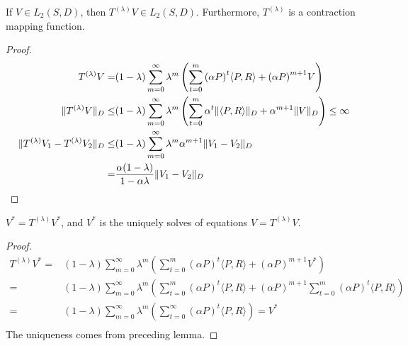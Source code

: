\begin{lem}
    If $ V \in L_2(S,D) $, then $ T^{(\lambda)} V \in L_2(S,D) $. 
    Furthermore, $ T^{(\lambda)} $ is a contraction mapping function. 
    \begin{proof}
        \begin{equation}
            \begin{aligned}
                T^{(\lambda)} V =& (1-\lambda) \sum^{\infty}_{m=0} \lambda^m
                \left( \sum^{m}_{t=0} {(\alpha P)}^t \langle P, R \rangle + {(\alpha P )}^{m+1} V \right)\\
                \Arrowvert T^{(\lambda)}V \Arrowvert_D
                \le& (1-\lambda) \sum^{\infty}_{m=0} \lambda^m 
                \left( \sum^{m}_{t=0} \alpha^t \Arrowvert \langle P, R \rangle \Arrowvert_D
                + \alpha^{m+1} \Arrowvert V \Arrowvert_D\right) \le \infty \\
                \Arrowvert T^{(\lambda)}V_1 - T^{(\lambda)}V_2 \Arrowvert_D
                \le& (1-\lambda) \sum^{\infty}_{m=0} \lambda^m \alpha^{m+1} \Arrowvert V_1 - V_2 \Arrowvert_D\\
                =& \frac{\alpha(1-\lambda)}{1-\alpha \lambda}  \Arrowvert V_1 - V_2 \Arrowvert_D
            \end{aligned}
        \end{equation}
    \end{proof}
\end{lem}

\begin{lem}
    $ V^* = T^{(\lambda)} V^* $, and $ V^* $ is the uniquely solves of equations $ V = T^{(\lambda)} V $.
    \begin{proof}
        \begin{equation}
            \begin{aligned}
                T^{(\lambda)} V^* 
                =& (1-\lambda) \sum^{\infty}_{m=0} \lambda^m
                \left( \sum^{m}_{t=0} {(\alpha P)}^t \langle P, R \rangle + {(\alpha P )}^{m+1} V^* \right)\\
                =& (1-\lambda) \sum^{\infty}_{m=0} \lambda^m
                \left( \sum^{m}_{t=0} {(\alpha P)}^t \langle P, R \rangle 
                + {(\alpha P )}^{m+1} \sum^{m}_{t=0} {(\alpha P)}^t \langle P, R \rangle \right)\\
                =& (1-\lambda) \sum^{\infty}_{m=0} \lambda^m
                \left( \sum^{\infty}_{t=0} {(\alpha P)}^t \langle P, R \rangle \right) = V^*\\
            \end{aligned}
        \end{equation}
        The uniqueness comes from preceding lemma.
    \end{proof}
\end{lem}

